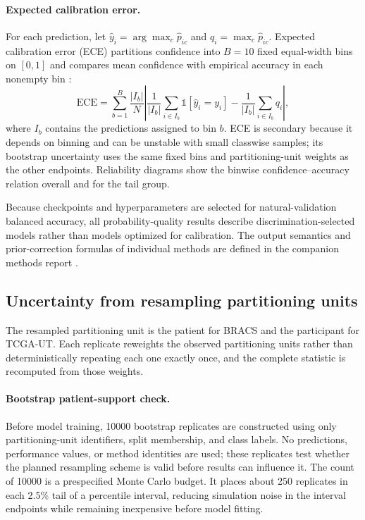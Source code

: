 \documentclass[11pt]{article}
\begin{document}
\paragraph{Expected calibration error.}
For each prediction, let $\hat{y}_i=\arg\max_c\hat{p}_{ic}$ and $q_i=\max_c\hat{p}_{ic}$. Expected calibration error (ECE) partitions confidence into $B=10$ fixed equal-width bins on $[0,1]$ and compares mean confidence with empirical accuracy in each nonempty bin \citep{naeini2015obtaining}:
\begin{equation}
  \mathrm{ECE}=\sum_{b=1}^{B}\frac{|I_b|}{N}
  \left|\frac{1}{|I_b|}\sum_{i\in I_b}\mathbb{1}[\hat{y}_i=y_i]
  -\frac{1}{|I_b|}\sum_{i\in I_b}q_i\right|,
  \label{eq:ece}
\end{equation}
\noindent where $I_b$ contains the predictions assigned to bin $b$. ECE is secondary because it depends on binning and can be unstable with small classwise samples; its bootstrap uncertainty uses the same fixed bins and partitioning-unit weights as the other endpoints. Reliability diagrams show the binwise confidence--accuracy relation overall and for the tail group.

Because checkpoints and hyperparameters are selected for natural-validation balanced accuracy, all probability-quality results describe discrimination-selected models rather than models optimized for calibration. The output semantics and prior-correction formulas of individual methods are defined in the companion methods report \citep{queisler2026imbalanceMethods}.

\subsection{Uncertainty from resampling partitioning units}
The resampled partitioning unit is the patient for BRACS and the participant for TCGA-UT. Each replicate reweights the observed partitioning units rather than deterministically repeating each one exactly once, and the complete statistic is recomputed from those weights.

\paragraph{Bootstrap patient-support check.}
Before model training, \num{10000} bootstrap replicates are constructed using only partitioning-unit identifiers, split membership, and class labels. No predictions, performance values, or method identities are used; these replicates test whether the planned resampling scheme is valid before results can influence it. The count of \num{10000} is a prespecified Monte Carlo budget. It places about 250 replicates in each 2.5\% tail of a percentile interval, reducing simulation noise in the interval endpoints while remaining inexpensive before model fitting.
\end{document}
